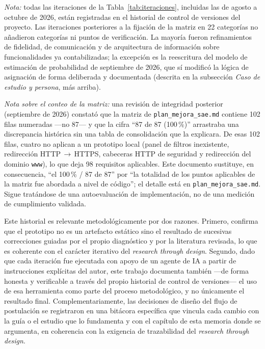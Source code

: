 {\begin{longtable}{p{2.2cm}p{9.5cm}}
\end{longtable}
}

\emph{Nota:} todas las iteraciones de la Tabla~\ref{tab:iteraciones}, incluidas las de agosto a octubre de 2026, están registradas en el historial de control de versiones del proyecto. Las iteraciones posteriores a la fijación de la matriz en 22 categorías no añadieron categorías ni puntos de verificación. La mayoría fueron refinamientos de fidelidad, de comunicación y de arquitectura de información sobre funcionalidades ya contabilizadas; la excepción es la reescritura del modelo de estimación de probabilidad de septiembre de 2026, que sí modificó la lógica de asignación de forma deliberada y documentada (descrita en la subsección \emph{Caso de estudio y persona}, más arriba).

\emph{Nota sobre el conteo de la matriz:} una revisión de integridad posterior (septiembre de 2026) constató que la matriz de \texttt{plan\_mejora\_sae.md} contiene 102 filas numeradas —no 87— y que la cifra ``87 de 87 (100\,\%)'' arrastraba una discrepancia histórica sin una tabla de consolidación que la explicara. De esas 102 filas, cuatro no aplican a un prototipo local (panel de filtros inexistente, redirección HTTP\,$\to$\,HTTPS, cabeceras HTTP de seguridad y redirección del dominio \texttt{www}), lo que deja 98 requisitos aplicables. Este documento sustituye, en consecuencia, ``el 100\,\% / 87 de 87'' por ``la totalidad de los puntos aplicables de la matriz fue abordada a nivel de código''; el detalle está en \texttt{plan\_mejora\_sae.md}. Sigue tratándose de una autoevaluación de implementación, no de una medición de cumplimiento validada.

Este historial es relevante metodológicamente por dos razones. Primero, confirma que el prototipo no es un artefacto estático sino el resultado de sucesivas correcciones guiadas por el propio diagnóstico y por la literatura revisada, lo que es coherente con el carácter iterativo del \emph{research through design}. Segundo, dado que cada iteración fue ejecutada con apoyo de un agente de IA a partir de instrucciones explícitas del autor, este trabajo documenta también —de forma honesta y verificable a través del propio historial de control de versiones— el uso de esa herramienta como parte del proceso metodológico, y no únicamente el resultado final. Complementariamente, las decisiones de diseño del flujo de postulación se registraron en una bitácora específica que vincula cada cambio con la guía o el estudio que lo fundamenta y con el capítulo de esta memoria donde se argumenta, en coherencia con la exigencia de trazabilidad del \emph{research through design}.

